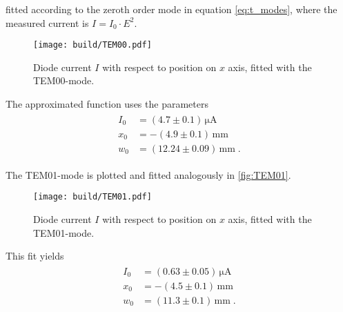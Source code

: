 fitted according to the zeroth order mode in equation \eqref{eq:t_modes}, where the measured current is $I=I_0\cdot E^2$.  
\begin{figure}
   \centering
   \texttt{[image: build/TEM00.pdf]}
   \caption{Diode current $I$ with respect to position on $x$ axis, fitted with the TEM00-mode.}
   \label{fig:TEM00}
\end{figure}
The approximated function uses the parameters
\begin{align}
   \begin{split}
      I_0 &= (4.7 \pm 0.1)\,\unit{\micro\ampere}\\
      x_0 &= -(4.9 \pm 0.1)\,\unit{\mm}\\
      w_0 &= (12.24 \pm 0.09)\,\unit{\mm}\;.
      \label{eq:TEM00_fit}
   \end{split}
\end{align}

The TEM01-mode is plotted and fitted analogously in \autoref{fig:TEM01}.



\begin{figure}
   \centering
   \texttt{[image: build/TEM01.pdf]}
   \caption{Diode current $I$ with respect to position on $x$ axis, fitted with the TEM01-mode.}
   \label{fig:TEM01}
\end{figure}
This fit yields
\begin{align}
   \begin{split}
   I_0 &= (0.63 \pm 0.05)\,\unit{\micro\ampere}\\
   x_0 &= -(4.5 \pm 0.1)\,\unit{\mm}\\
   w_0 &= (11.3 \pm 0.1)\,\unit{\mm}\;.
   \label{eq:TEM01_fit}
   \end{split}
\end{align}


